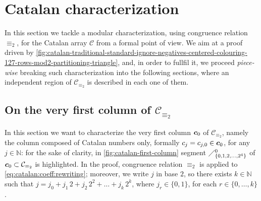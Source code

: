 
\section{Catalan characterization}
\label{sec:catalan:characterization}


In this section we tackle a modular characterization, using congruence relation
$\equiv_{2}$, for the Catalan array $\mathcal{C}$ from a formal point of view.
We aim at a proof driven by
\autoref{fig:catalan-traditional-standard-ignore-negatives-centered-colouring-127-rows-mod2-partitioning-triangle},
and, in order to fullfil it, we proceed \emph{piece-wise} breaking such
characterization into the following sections, where an independent region of
$\mathcal{C}_{\equiv_{2}}$ is described in each one of them.


\subsection{On the very first column of $\mathcal{C}_{\equiv_{2}}$}

In this section we want to characterize the very first column $\boldsymbol{c}_{0}$
of $\mathcal{C}_{\equiv_{2}}$, namely the column composed of Catalan numbers only,
formally $c_{j}=c_{j,0}\in\boldsymbol{c}_{0}$, for any $j\in\mathbb{N}$:  
for the sake of clarity, in \autoref{fig:catalan-first-column} segment
$\diagup_{\lbrace 0,1,2,\ldots,2^{4}\rbrace}^{0}$ of $\boldsymbol{c}_{0}\subset\mathcal{C}_{\equiv_{2}}$
is highlighted. In the proof, congruence relation $\equiv_{2}$ is applied to \autoref{eq:catalan:coeff:rewriting};
moreover, we write $j$ in base $2$, so there exists $k\in\mathbb{N}$ such that 
$j=j_{0} + j_{1}\,2 + j_{2}\,2^{2} + \ldots + j_{k}\,2^{k}$, where
$j_{r}\in\lbrace0,1\rbrace$, for each $r\in\lbrace0,\ldots,k\rbrace$. 

